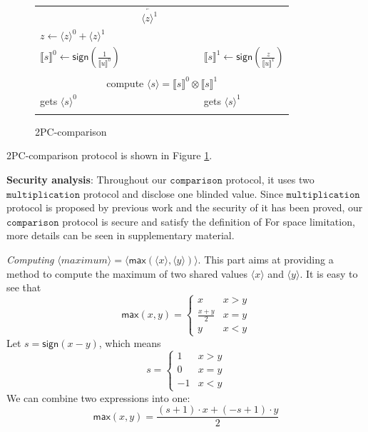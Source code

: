 \documentclass[letterpaper]{article} %
\begin{document}
\begin{figure}[ht]
{\begin{tabular}{lcl}
            \hdashline
            & $\underleftarrow{~~~~~\langle z\rangle ^{1}~~~~~}$~~~~~ &\\
            $z\leftarrow\langle z\rangle ^{0}+\langle z\rangle ^{1}$& &\\
            $\llbracket s \rrbracket^{0}
            \leftarrow \mathsf{sign}(\frac{1}{\llbracket u \rrbracket^{0}})$&
            &$\llbracket s \rrbracket^{1}
            \leftarrow \mathsf{sign}(\frac{z}{\llbracket u \rrbracket^{1}})$\\

            \hdashline
            \multicolumn{3}{c}{run $\mathtt{multiplication}$ protocol to}\\
            \multicolumn{3}{c}{compute $
            \langle s\rangle = \llbracket s \rrbracket ^{0} \otimes \llbracket s \rrbracket ^{1}$}\\

            gets $\langle s\rangle ^{0}$& &gets $\langle s\rangle ^{1}$\\
            \hdashline
            \hline
        \end{tabular}}
        \caption{2PC-comparison}
        \label{2PC-comparison}
    \end{figure}
    2PC-comparison protocol is shown in Figure \ref{2PC-comparison}.

    \textbf{Security analysis}:
       Throughout our $\mathtt{comparison}$ protocol,
       it uses two $\mathtt{multiplication}$ protocol and disclose one blinded value.
       Since $\mathtt{multiplication}$ protocol is proposed by previous work
       and the security of it has been proved, our $\mathtt{comparison}$ protocol is secure
       and satisfy the definition of
       For space limitation, more details can be seen in supplementary material.



       \emph{Computing} $ \langle maximum\rangle  = \langle \mathsf{max}(\langle x\rangle,\langle y\rangle)\rangle $.
       This part aims at providing a method to compute the maximum of two shared values $\langle x \rangle$ and $\langle y \rangle$.
       It is easy to see that
       $$\mathsf{max}(x,y) = \left\{\begin{matrix}
           x & x>y\\
           \frac{x+ y}{2} & x=y\\
           y & x<y
           \end{matrix}\right.$$
       Let $s = \mathsf{sign}(x-y)$, which means
       $$s = \left\{\begin{matrix}
           1 & x>y\\
           0 & x=y\\
           -1 & x<y
           \end{matrix}\right.$$
       We can combine two expressions into one:
       $$\mathsf{max}(x,y) = \frac{(s+1)\cdot x+ (-s+1)\cdot y}{2}$$
\end{document}
